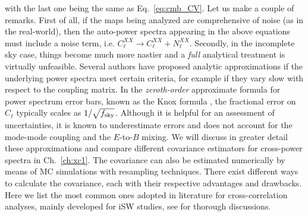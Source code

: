 %
with the last one being the same as Eq.~\eqref{eq:cmb_CV}. Let us make a couple of remarks. First of all, if the maps being analyzed are comprehensive of noise (as in the real-world), then the auto-power spectra appearing in the above equations must include a noise term, i.e. $C_{\ell}^{XX} \to C_{\ell}^{XX} + N_{\ell}^{XX}$. Secondly, in the incomplete sky case, things become much more nastier and a \emph{full} analytical treatment is virtually unfeasible. Several authors \citep{Efstathiou2004a,Tristram2005,Brown2005} have proposed analytic approximations if the underlying power spectra meet certain criteria, for example if they vary slow with respect to the coupling matrix. In the \emph{zeroth-order} approximate formula for power spectrum error bars, known as the Knox formula \citep{Knox1995}, the fractional error on $C_{\ell}$ typically scales as $1/\sqrt{f_{\rm{sky}}}$. Although it is helpful for an assessment of uncertainties, it is known to underestimate errors and does not account for the mode-mode coupling and the $E$-to-$B$ mixing. We will discuss in greater detail these approximations and compare different covariance estimators for cross-power spectra in Ch.~\eqref{ch:xc1}. The covariance can also be estimated numerically by means of MC simulations with resampling techniques. There exist different ways to calculate the covariance, each with their respective advantages and drawbacks. Here we list the most common  ones adopted in literature for cross-correlation analyses, mainly developed for \gls{iSW} studies, see \citet{Cabre2007,Giannantonio2008} for thorough discussions.

